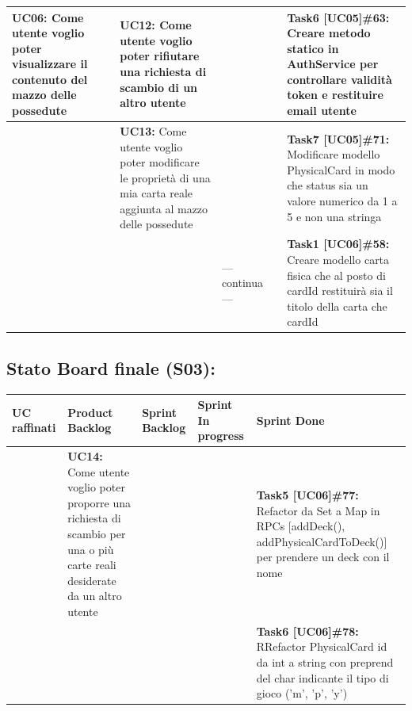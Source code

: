 \documentclass[a4paper, oneside]{article}
\begin{document}
\begin{landscape}
\begin{tabular}{ | p{4.5cm} | p{4.3cm} | p{3.7cm} | p{5cm} | p{5.5cm}| }
            \hline
            \textbf{UC06:} Come utente voglio poter visualizzare il contenuto del mazzo delle possedute & \textbf{UC12:} Come utente voglio poter rifiutare una richiesta di scambio di un altro utente & & & \textbf{Task6 [UC05]\#63:} Creare metodo statico in AuthService per controllare validità token e restituire email utente \\
            \hline
            & \textbf{UC13:} Come utente voglio poter modificare le proprietà di una mia carta reale aggiunta al mazzo delle possedute & & & \textbf{Task7 [UC05]\#71:} Modificare modello PhysicalCard in modo che status sia un valore numerico da 1 a 5 e non una stringa \\
            \hline
            &  & ---continua--- & & \textbf{Task1 [UC06]\#58:} Creare modello carta fisica che al posto di cardId restituirà sia il titolo della carta che cardId \\
            \hline
        \end{tabular}

        \newpage
        \subsection{Stato Board finale (S03):}
        \small
        \def\arraystretch{2}%
        \begin{tabular}{ | p{4.5cm} | p{4.3cm} | p{3.7cm} | p{5cm} | p{5.5cm}| }
            \hline
            \textbf{UC raffinati}
            & \textbf{Product Backlog}
            & \textbf{Sprint Backlog}
            & \textbf{Sprint In progress}
            & \textbf{Sprint Done} \\
            \hline
            \hline
            & \textbf{UC14:} Come utente voglio poter proporre una richiesta di scambio per una o più carte reali desiderate da un altro utente &  & & \textbf{Task5 [UC06]\#77:} Refactor da Set a Map in RPCs [addDeck(), addPhysicalCardToDeck()] per prendere un deck con il nome \\
            \hline
            & &  & & \textbf{Task6 [UC06]\#78:} RRefactor PhysicalCard id da int a string con preprend del char indicante il tipo di gioco ('m', 'p', 'y') \\
            \hline
        \end{tabular}

        \newpage
        \normalsize

\end{landscape}
\end{document}
